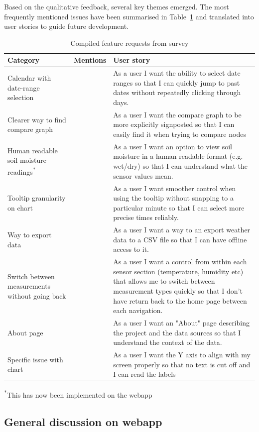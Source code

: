 Based on the qualitative feedback, several key themes emerged. The most
frequently mentioned issues have been summarised in
Table~\ref{tab:feature-requests} and translated into user stories to guide
future development.

\begin{table}[H]
  \centering
  \small
  \begin{tabularx}{\textwidth}{>{\RaggedRight\arraybackslash}p{}
  >{\centering\arraybackslash}p{1.5cm} >{\RaggedRight\arraybackslash}X}
    \hline
    Category & Mentions & User story \\
    \hline
    Calendar with date-range selection & 4 & As a user I want the ability to
    select date ranges so that I can quickly jump to past dates without
    repeatedly clicking through days. \\
    \hline
    Clearer way to find compare graph & 2 & As a user I want the compare graph
    to be more explicitly signposted so that I can easily find it when trying to
    compare nodes \\
    \hline
    Human readable soil moisture readings\textsuperscript{*} & 1 & As a user I
    want an option to view soil moisture in a human readable format (e.g.
    wet/dry) so that I can understand what the sensor values mean. \\
    \hline
    Tooltip granularity on chart & 1 & As a user I want smoother control when
    using the tooltip without snapping to a particular minute so that I can
    select more precise times reliably. \\
    \hline
    Way to export data  & 1 & As a user I want a way to an export weather data
    to a CSV file so that I can have offline access to it. \\
    \hline
    Switch between measurements without going back & 1 & As a user I want a
    control from within each sensor section (temperature, humidity etc) that
    allows me to switch between measurement types quickly so that I don't have
    return back to the home page between each navigation. \\
    \hline
    About page & 1 & As a user I want an "About" page describing the project and
    the data sources so that I understand the context of the data. \\
    \hline
    Specific issue with chart & 1 & As a user I want the Y axis to align with my
    screen properly so that no text is cut off and I can read the labels \\
    \hline
  \end{tabularx}
\noindent\textsuperscript{*}\small This has now been implemented on the webapp
\caption{Compiled feature requests from survey}
  \label{tab:feature-requests}
\end{table}

\subsection{General discussion on webapp}

